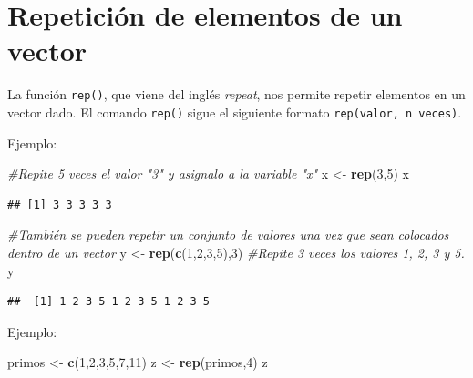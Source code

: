 \documentclass[
]{book}
\newenvironment{Shaded}{\begin{snugshade}}{\end{snugshade}}
\newcommand{\CommentTok}[1]{\textcolor[rgb]{0.56,0.35,0.01}{\textit{#1}}}
\newcommand{\DecValTok}[1]{\textcolor[rgb]{0.00,0.00,0.81}{#1}}
\newcommand{\FunctionTok}[1]{\textcolor[rgb]{0.13,0.29,0.53}{\textbf{#1}}}
\newcommand{\NormalTok}[1]{#1}
\newcommand{\OtherTok}[1]{\textcolor[rgb]{0.56,0.35,0.01}{#1}}
\begin{document}
\section{Repetición de elementos de un vector}\label{repeticiuxf3n-de-elementos-de-un-vector}

La función \texttt{rep()}, que viene del inglés \emph{repeat}, nos permite repetir elementos en un vector dado.
El comando \texttt{rep()} sigue el siguiente formato \texttt{rep(valor,\ n\ veces)}.

Ejemplo:

\begin{Shaded}
\begin{Highlighting}[]
\CommentTok{\#Repite 5 veces el valor "3" y asignalo a la variable "x"}
\NormalTok{x }\OtherTok{\textless{}{-}} \FunctionTok{rep}\NormalTok{(}\DecValTok{3}\NormalTok{,}\DecValTok{5}\NormalTok{)}
\NormalTok{x}
\end{Highlighting}
\end{Shaded}

\begin{verbatim}
## [1] 3 3 3 3 3
\end{verbatim}

\begin{Shaded}
\begin{Highlighting}[]
\CommentTok{\#También se pueden repetir un conjunto de valores una vez que sean colocados dentro de un vector}
\NormalTok{y }\OtherTok{\textless{}{-}} \FunctionTok{rep}\NormalTok{(}\FunctionTok{c}\NormalTok{(}\DecValTok{1}\NormalTok{,}\DecValTok{2}\NormalTok{,}\DecValTok{3}\NormalTok{,}\DecValTok{5}\NormalTok{),}\DecValTok{3}\NormalTok{) }\CommentTok{\#Repite 3 veces los valores 1, 2, 3 y 5. }
\NormalTok{y}
\end{Highlighting}
\end{Shaded}

\begin{verbatim}
##  [1] 1 2 3 5 1 2 3 5 1 2 3 5
\end{verbatim}

Ejemplo:

\begin{Shaded}
\begin{Highlighting}[]
\NormalTok{primos }\OtherTok{\textless{}{-}} \FunctionTok{c}\NormalTok{(}\DecValTok{1}\NormalTok{,}\DecValTok{2}\NormalTok{,}\DecValTok{3}\NormalTok{,}\DecValTok{5}\NormalTok{,}\DecValTok{7}\NormalTok{,}\DecValTok{11}\NormalTok{)}
\NormalTok{z }\OtherTok{\textless{}{-}} \FunctionTok{rep}\NormalTok{(primos,}\DecValTok{4}\NormalTok{)}
\NormalTok{z}
\end{Highlighting}
\end{Shaded}
\end{document}
